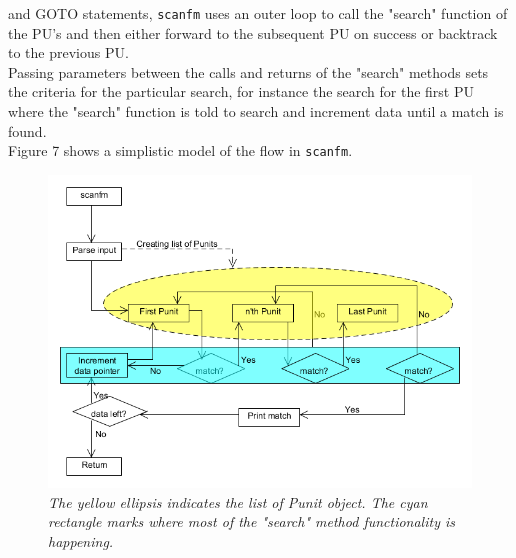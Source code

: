 \documentclass[12pt]{article}
\newcommand{\sfm}{\texttt{scanfm} }
\newcommand{\pu}{PU }
\newcommand{\pus}{PU's }
\newcommand{\pup}{PU. }
\begin{document}
and GOTO statements, \sfm uses an outer loop to call the "search" function of the \pus and then either
forward to the subsequent \pu on success or backtrack to the previous \pup \\
Passing parameters between the calls and returns of the "search" methods sets the criteria for the particular search, for
instance the search for the first \pu where the "search" function is told to search and increment data until a match is \\
found. \\
Figure 7 shows a simplistic model of the flow in \texttt{scanfm}.
\begin{figure}[H]
\begin{center}
\includegraphics[scale=0.7]{flowdia.png}
\end{center}
\caption{\textit{The yellow ellipsis indicates the list of Punit object. The cyan rectangle marks where most of the "search"
method functionality is happening.}}
\end{figure}
\end{document}
